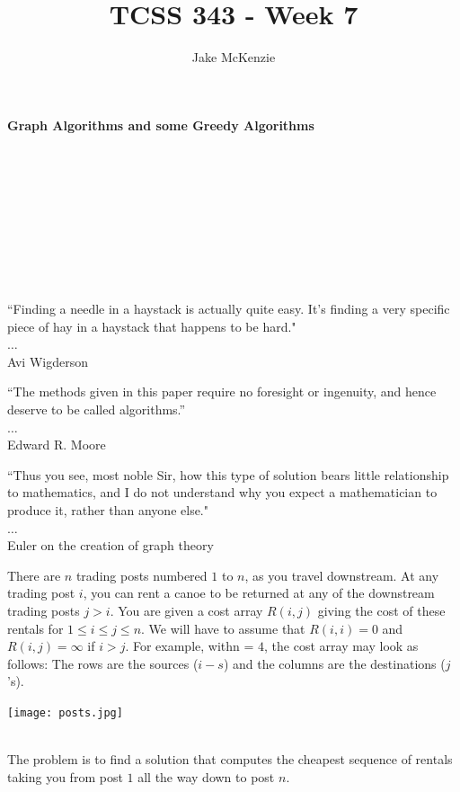 \documentclass[12pt]{article}
\begin{document}
\title{TCSS 343 - Week 7}
\author{Jake McKenzie}
\maketitle
\noindent\centerline{\textbf{Graph Algorithms and some Greedy Algorithms}}\\\\\\\\\\\\\\\\
\begin{center}
    ``Finding a needle in a haystack is actually quite easy. It's finding a very specific piece of hay in a haystack that happens to be hard." \\$\dots$\\ Avi Wigderson
\end{center}
\begin{center}
    ``The methods given in this paper require no foresight or ingenuity,
    and hence deserve to be called algorithms.'' \\$\dots$\\ Edward R. Moore
\end{center}
\begin{center}
    ``Thus you see, most noble Sir, how this type of solution bears little relationship to
    mathematics, and I do not understand why you expect a mathematician to
    produce it, rather than anyone else." \\$\dots$\\ Euler on the creation of graph theory
\end{center}
\newpage
\noindent There are $n$ trading posts numbered $1$ to $n$, 
as you travel downstream. At any trading post $i$, you can rent 
a canoe to be returned at any of the downstream trading posts $j > i$. 
You are given a cost array $R(i,j)$ giving the cost of these rentals for 
$1 \leq i \leq j \leq n$. We will have to assume that $R(i,i) = 0$ and $R(i,j) = \infty$ 
if $i > j$. For example, withn = $4$, the cost array may look as follows: The rows are the 
sources ($i - s$) and the columns are the destinations ($j$’s).\\
\centerline{\texttt{[image: posts.jpg]}}\\
The problem is to find a solution that computes the cheapest sequence of rentals taking 
you from post $1$ all the way down to post $n$. \\\\
\end{document}
